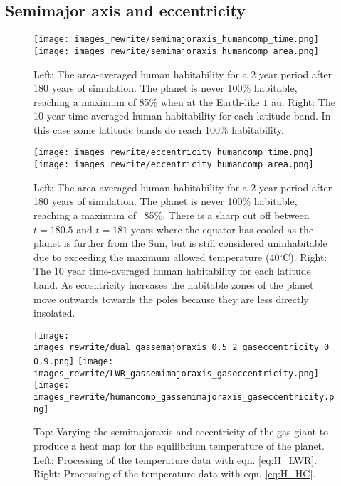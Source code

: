 \documentclass[12pt, onecolumn]{revtex4-2}    %
\newcommand{\degrees}{\ensuremath{^{\circ}}}
\begin{document}
\subsection{Semimajor axis and eccentricity} \label{ssec:qualitative_semimajoraxis_eccentricity}
\begin{figure}
  \texttt{[image: images\_rewrite/semimajoraxis\_humancomp\_time.png]}
  \texttt{[image: images\_rewrite/semimajoraxis\_humancomp\_area.png]}
  \caption{
    Left: The area-averaged human habitability for a 2 year period after 180 years of simulation.
    The planet is never 100\% habitable, reaching a maximum of 85\% when at the Earth-like $1$ au.
    Right: The 10 year time-averaged human habitability for each latitude band.
    In this case some latitude bands do reach 100\% habitability.
  }
  \label{fig:qualitative_semimajoraxis}
\end{figure}

\begin{figure}
  \texttt{[image: images\_rewrite/eccentricity\_humancomp\_time.png]}
  \texttt{[image: images\_rewrite/eccentricity\_humancomp\_area.png]}
  \caption{
    Left: The area-averaged human habitability for a 2 year period after 180 years of simulation.
    The planet is never 100\% habitable, reaching a maximum of ~85\%.
    There is a sharp cut off between $t=180.5$ and $t=181$ years where the equator has cooled as the planet is further from the Sun, but is still considered uninhabitable due to exceeding the maximum allowed temperature (40\degrees C).
    Right: The 10 year time-averaged human habitability for each latitude band.
    As eccentricity increases the habitable zones of the planet move outwards towards the poles because they are less directly insolated.
  }
  \label{fig:qualitative_eccentricity}
\end{figure}

\begin{figure}
  \texttt{[image: images\_rewrite/dual\_gassemajoraxis\_0.5\_2\_gaseccentricity\_0\_0.9.png]}
  \texttt{[image: images\_rewrite/LWR\_gassemimajoraxis\_gaseccentricity.png]}
  \texttt{[image: images\_rewrite/humancomp\_gassemimajoraxis\_gaseccentricity.png]}
  \caption{
    Top: Varying the semimajoraxis and eccentricity of the gas giant to produce a heat map for the equilibrium temperature of the planet.
    Left: Processing of the temperature data with eqn. \eqref{eq:H_LWR}.
    Right: Processing of the temperature data with eqn. \eqref{eq:H_HC}.
  }
  \label{fig:qualitative_semimajoraxis_eccentricity}
\end{figure}
\end{document}
